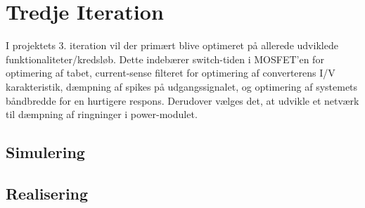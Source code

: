 
\chapter{Tredje Iteration}
I projektets 3. iteration vil der primært blive optimeret på allerede udviklede funktionaliteter/kredsløb. Dette indebærer switch-tiden i MOSFET'en for optimering af tabet, current-sense filteret for optimering af converterens I/V karakteristik, dæmpning af spikes på udgangssignalet, og optimering af systemets båndbredde for en hurtigere respons. Derudover vælges det, at udvikle et netværk til dæmpning af ringninger i power-modulet. 













\clearpage

\section{Simulering}















\clearpage

\section{Realisering}















\clearpage

